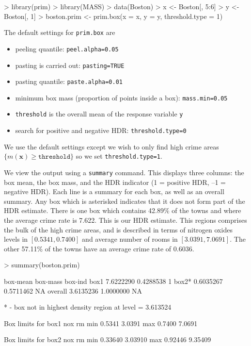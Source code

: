 \documentclass[a4paper,11pt]{article}
\renewcommand{\vec}[1]{\boldsymbol{#1}}
\def\vecx{\vec{x}}
\begin{document}
\begin{Schunk}
\begin{Sinput}
> library(prim)
> library(MASS)
> data(Boston)
> x <- Boston[, 5:6]
> y <- Boston[, 1]
> boston.prim <- prim.box(x = x, y = y, threshold.type = 1)
\end{Sinput}
\end{Schunk}
The default settings for \texttt{prim.box} are
\begin{itemize}
\item peeling quantile: \texttt{peel.alpha=0.05}
\item pasting is carried out: \texttt{pasting=TRUE} 
\item pasting quantile: \texttt{paste.alpha=0.01}
\item minimum box mass (proportion of points inside a box): 
 \texttt{mass.min=0.05} 
\item \texttt{threshold} is the overall mean of the response variable \texttt{y}
\item search for positive and negative HDR: \texttt{threshold.type=0}
\end{itemize}
We use the default settings except we wish to only find high crime areas 
$\lbrace m(\vecx) \geq \texttt{threshold} \rbrace$
so we set \texttt{threshold.type=1}. 

We view the output using a \texttt{summary} command. This displays three
columns: the box mean, the box mass, and the HDR indicator 
(1 = positive HDR, --1 = negative HDR). Each line is a summary
for each box, as well as an overall summary. Any box which is asterisked
indicates that it does not form part of the HDR estimate.
There is one box which contains 42.89\% of the towns
and where the average crime rate is 7.622. This is our HDR estimate. 
This regions comprises the bulk
of the high crime areas, and is described in terms of 
nitrogen oxides levels in $[0.5341, 0.7400]$ 
and average number of rooms in $[3.0391, 7.0691]$.
The other 57.11\% of the
towns have an average crime rate of 0.6036.

\begin{Schunk}
\begin{Sinput}
> summary(boston.prim)
\end{Sinput}
\begin{Soutput}
         box-mean  box-mass box-ind
box1    7.6222290 0.4288538       1
box2*   0.6035267 0.5711462      NA
overall 3.6135236 1.0000000      NA

* - box not in highest density region at level = 3.613524 

Box limits for box1
       nox     rm
min 0.5341 3.0391
max 0.7400 7.0691

Box limits for box2
        nox      rm
min 0.33640 3.03910
max 0.92446 9.35409
\end{Soutput}
\end{Schunk}
\end{document}
